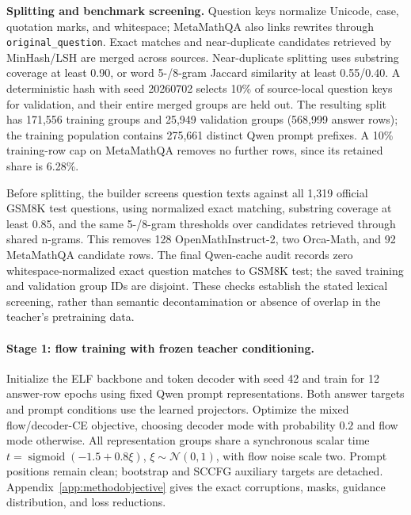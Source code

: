 \documentclass{article}
\begin{document}
\textbf{Splitting and benchmark screening.} Question keys normalize Unicode, case, quotation marks, and whitespace; MetaMathQA also links rewrites through \texttt{original\_question}. Exact matches and near-duplicate candidates retrieved by MinHash/LSH are merged across sources. Near-duplicate splitting uses substring coverage at least 0.90, or word 5-/8-gram Jaccard similarity at least 0.55/0.40. A deterministic hash with seed 20260702 selects 10\% of source-local question keys for validation, and their entire merged groups are held out. The resulting split has 171,556 training groups and 25,949 validation groups (568,999 answer rows); the training population contains 275,661 distinct Qwen prompt prefixes. A 10\% training-row cap on MetaMathQA removes no further rows, since its retained share is 6.28\%.

Before splitting, the builder screens question texts against all 1,319 official GSM8K test questions, using normalized exact matching, substring coverage at least 0.85, and the same 5-/8-gram thresholds over candidates retrieved through shared n-grams. This removes 128 OpenMathInstruct-2, two Orca-Math, and 92 MetaMathQA candidate rows. The final Qwen-cache audit records zero whitespace-normalized exact question matches to GSM8K test; the saved training and validation group IDs are disjoint. These checks establish the stated lexical screening, rather than semantic decontamination or absence of overlap in the teacher's pretraining data.

\paragraph{Stage 1: flow training with frozen teacher conditioning.}
Initialize the ELF backbone and token decoder with seed 42 and train for 12 answer-row epochs using fixed Qwen prompt representations. Both answer targets and prompt conditions use the learned projectors. Optimize the mixed flow/decoder-CE objective, choosing decoder mode with probability $0.2$ and flow mode otherwise. All representation groups share a synchronous scalar time $t=\operatorname{sigmoid}(-1.5+0.8\xi)$, $\xi\sim\mathcal N(0,1)$, with flow noise scale two. Prompt positions remain clean; bootstrap and SCCFG auxiliary targets are detached. Appendix~\ref{app:methodobjective} gives the exact corruptions, masks, guidance distribution, and loss reductions.
\end{document}

